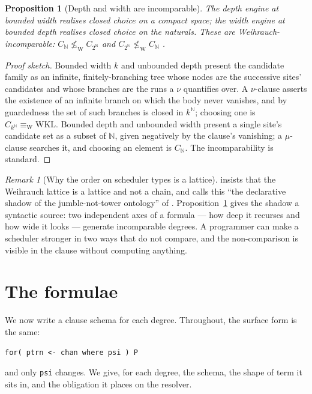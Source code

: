 \documentclass[11pt]{article}
\theoremstyle{definition}
\theoremstyle{plain}
\newtheorem{proposition}{Proposition}
\theoremstyle{remark}
\newtheorem{remark}{Remark}
\newcommand{\WKL}{\mathrm{WKL}}
\newcommand{\lw}{\leq_{\mathrm{W}}}
\newcommand{\ew}{\equiv_{\mathrm{W}}}
\newcommand{\Can}{2^{\mathbb{N}}}
\begin{document}
\begin{proposition}[Depth and width are incomparable]\label{prop:incomparable}
The depth engine at bounded width realises closed choice on a compact space; the width
engine at bounded depth realises closed choice on the naturals. These are
Weihrauch-incomparable: $C_{\mathbb{N}} \not\lw C_{\Can}$ and
$C_{\Can} \not\lw C_{\mathbb{N}}$ \cite{weihrauch}.
\end{proposition}

\begin{proof}[Proof sketch]
Bounded width $k$ and unbounded depth present the candidate family as an infinite,
finitely-branching tree whose nodes are the successive sites' candidates and whose
branches are the runs a $\nu$ quantifies over. A $\nu$-clause asserts the existence of
an infinite branch on which the body never vanishes, and by guardedness the set of such
branches is closed in $k^{\mathbb{N}}$; choosing one is $C_{k^{\mathbb{N}}} \ew \WKL$.
Bounded depth and unbounded width present a single site's candidate set as a subset of
$\mathbb{N}$, given negatively by the clause's vanishing; a $\mu$-clause searches it,
and choosing an element is $C_{\mathbb{N}}$. The incomparability is standard.
\end{proof}

\begin{remark}[Why the order on scheduler types is a lattice]\label{rem:lattice}
\cite{choicesched} insists that the Weihrauch lattice is a lattice and not a chain, and
calls this ``the declarative shadow of the jumble-not-tower ontology'' of
\cite{agency}. Proposition~\ref{prop:incomparable} gives the shadow a syntactic
source: two independent axes of a formula --- how deep it recurses and how wide it
looks --- generate incomparable degrees. A programmer can make a scheduler stronger in
two ways that do not compare, and the non-comparison is visible in the clause without
computing anything.
\end{remark}

\section{The formulae}\label{sec:formulae}

We now write a clause schema for each degree. Throughout, the surface form is the same:
\begin{lstlisting}
for( ptrn <- chan where psi ) P
\end{lstlisting}
and only \texttt{psi} changes. We give, for each degree, the schema, the shape of term
it sits in, and the obligation it places on the resolver.
\end{document}
